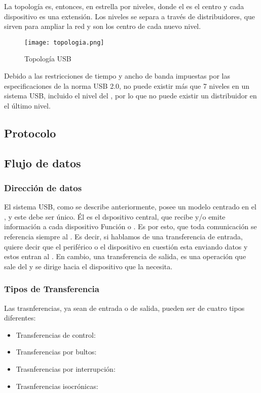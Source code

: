     La topología es, entonces, en estrella por niveles, donde el \host es el
    centro y cada dispositivo es una extensión. Los niveles se separa a través
    de distribuidores, que sirven para ampliar la red y son los centro de cada
    nuevo nivel.\\

    \begin{figure}
      \centering
      \texttt{[image: topologia.png]}
      \caption{Topología USB}
      \label{}
    \end{figure}

    Debido a las restricciones de tiempo y ancho de banda impuestas por las
    especificaciones de la norma USB 2.0, no puede existir más que 7 niveles
    en un sistema USB, incluido el nivel del \host, por lo que no puede existir
    un distribuidor en el último nivel.\\

    \subsection{Protocolo}


    \subsection{Flujo de datos}
      \subsubsection{Dirección de datos}
      El sistema USB, como se describe anteriormente, posee un modelo centrado
      en el \host, y este debe ser único. Él es el dspositivo central, que
      recibe y/o emite información a cada dispositivo Función o \Hub. Es por
      esto, que toda comunicación se referencia siempre al \host. Es decir, si
      hablamos de una transferencia de entrada, quiere decir que el periférico
      o el dispositivo en cuestión esta enviando datos y estos entran al \host.
      En cambio, una transferencia de salida, es una operación que sale del
      \host y se dirige hacia el dispositivo que la necesita.

      \subsubsection{Tipos de Transferencia}
      Las trasnferencias, ya sean de entrada o de salida, pueden ser de cuatro
      tipos diferentes:

      \begin{itemize}
         \item Transferencias de control:
         \item Transferencias por bultos:
         \item Trasnferencias por interrupción:
         \item Trasnferencias isocrónicas:
      \end{itemize}


